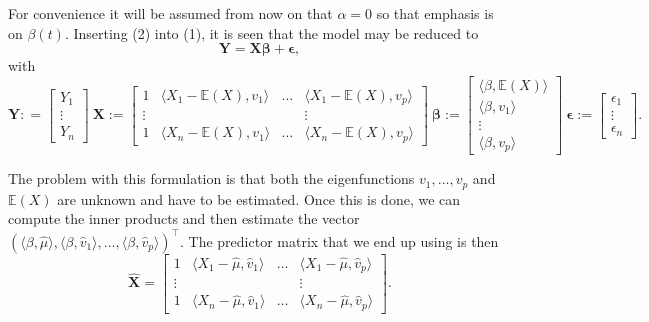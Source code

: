 \documentclass[11pt]{article}
\begin{document}
For convenience it will be assumed from now on that  $\alpha = 0 $ so that emphasis is on $\beta(t)$. Inserting (2) into (1), it is seen that the model may be reduced to
\begin{equation}
\label{eq:4}
\mathbf{Y} = \mathbf{X} \boldsymbol{\beta} + \boldsymbol{\epsilon}, 
\end{equation}
with 
\begin{equation}
\label{eq:38}
\mathbf{Y} : = \begin{bmatrix}
Y_1 \\  \vdots \\  Y_n
\end{bmatrix} \ \mathbf{X} := \begin{bmatrix}
1 & \langle X_1 -\mathbb{E}(X), v_1 \rangle  &  \ldots & \langle X_1 -\mathbb{E}(X), v_p \rangle \\ \vdots &  & & \vdots  \\ 1 &  \langle X_n-\mathbb{E}(X), v_1 \rangle  &  \ldots & \langle X_n-\mathbb{E}(X), v_p \rangle 
\end{bmatrix} \  \boldsymbol{\beta} :=  \begin{bmatrix}
\langle \beta, \mathbb{E}(X) \rangle  \\ \langle \beta, v_1 \rangle \\ \vdots \\ \langle \beta ,  v_p \rangle
\end{bmatrix} \ \boldsymbol{\epsilon} :=  \begin{bmatrix}
\epsilon_1 \\ \vdots \\  \epsilon_n
\end{bmatrix}.
\end{equation}

The problem with this formulation is that both the eigenfunctions $v_1,\ldots,v_p$ and $\mathbb{E}(X)$ are unknown and have to be estimated. Once this is done, we can compute the inner products and then estimate the vector $\left( \langle \beta, \widehat{\mu} \rangle, \langle \beta, \widehat{v}_1 \rangle, \ldots, \langle \beta, \widehat{v}_p \rangle \right)^{\top}$. The predictor matrix that we end up using is then
\begin{equation}
\mathbf{\widehat{X}} = \begin{bmatrix}
1 & \langle X_1 -\widehat{\mu}, \widehat{v}_1 \rangle  &  \ldots & \langle X_1 -\widehat{\mu}, \widehat{v}_p \rangle \\ \vdots &  & & \vdots  \\ 1 &  \langle X_n-\widehat{\mu}, \widehat{v}_1 \rangle  &  \ldots & \langle X_n-\widehat{\mu}, \widehat{v}_p \rangle 
\end{bmatrix}.
\end{equation}
\end{document}
